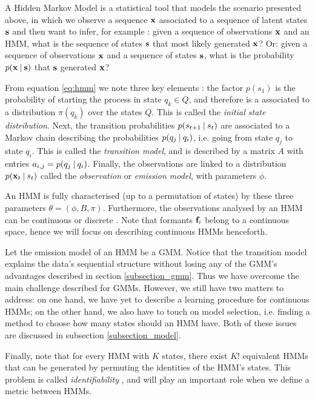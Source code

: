 \documentclass[../main.tex]{subfiles}
\begin{document}
\par A Hidden Markov Model is a statistical tool that models the scenario presented above, in which we observe a sequence $\mathbf{x}$ associated to a sequence of latent states $\mathbf{s}$ and then want to infer, for example \cite{Jurafsky2009, Bishop2006}: given a sequence of observations $\mathbf{x}$ and an HMM, what is the sequence of states $\mathbf{s}$ that most likely generated $\mathbf{x}$? Or: given a sequence of observations $\mathbf{x}$ and a sequence of states $\mathbf{s}$, what is the probability $p(\mathbf{x} \:\vert\: \mathbf{s})$ that $\mathbf{s}$ generated $\mathbf{x}$?  
\par From equation \ref{eq:hmm} we note three key elements \cite{Ghahramani2001}: the factor $p(s_1)$ is the probability of starting the process in state $q_k \in Q$, and therefore is a associated to a distribution $\pi(q_k)$ over the states $Q$. This is called the \emph{initial state distribution}. Next, the transition probabilities $p(s_{t+1} \:\vert\: s_t)$ are associated to a Markov chain describing the probabilities $p(q_j \:\vert\: q_i)$, i.e. going from state $q_j$ to state $q_i$. This is called the \emph{transition model}, and is described by a matrix $A$ with entries $a_{i,j} = p(q_j \:\vert\: q_i)$. Finally, the observations are linked to a distribution $p(\mathbf{x}_t \:\vert\: s_t)$ called the \emph{observation} or \emph{emission model}, with parameters $\phi$. 
\par An HMM is fully characterised (up to a permutation of states) by these three parameters $\theta = (\phi, B, \pi)$. Furthermore, the observations analysed by an HMM can be continuous or discrete \cite{Jurafsky2009}. Note that formants $\mathbf{f}_i$ belong to a continuous space, hence we will focus on describing continuous HMMs henceforth.
\par Let the emission model of an HMM be a GMM. Notice that the transition model explains the data's sequential structure without losing any of the GMM's advantages described in section \ref{subsection_gmm}. Thus we have overcome the main challenge described for GMMs. However, we still have two matters to address: on one hand, we have yet to describe a learning procedure for continuous HMMs; on the other hand, we also have to touch on model selection, i.e. finding a method to choose how many states should an HMM have. Both of these issues are discussed in subsection \ref{subsection_model}.
\par Finally, note that for every HMM with $K$ states, there exist $K!$ equivalent HMMs that can be generated by permuting the identities of the HMM's states. This problem is called \emph{identifiability} \cite{Bishop2006}, and will play an important role when we define a metric between HMMs. 
\end{document}
